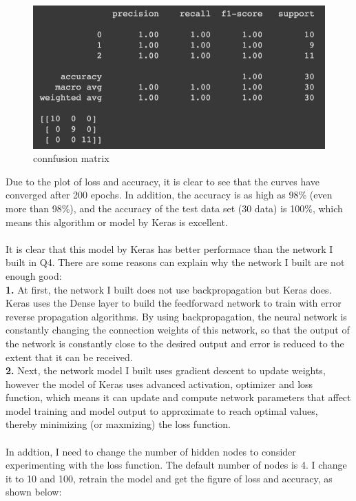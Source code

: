 \documentclass{article}
\begin{document}
\begin{figure}[H]
\centering
\includegraphics[scale=0.3]{matrix.png}
\caption{connfusion matrix}
\end{figure}
\noindent
Due to the plot of loss and accuracy, it is clear to see that the curves have converged after 200 epochs. In addition, the accuracy is as high as 98\% (even more than 98\%), and the accuracy of the test data set (30 data) is 100\%, which means this algorithm or model by Keras is excellent.\\\\
It is clear that this model by Keras has better performace than the network I built in Q4. There are some reasons can explain why the network I built are not enough good:\\
\textbf{1.} At first, the network I built does not use backpropagation but Keras does. Keras uses the Dense layer to build the feedforward network to train with error reverse propagation algorithms. By using backpropagation, the neural network is constantly changing the connection weights of this network, so that the output of the network is constantly close to the desired output and error is reduced to the extent that it can be received.\\
\textbf{2.} Next, the network model I built uses gradient descent to update weights, however the model of Keras uses advanced activation, optimizer and loss function, which means it can update and compute network parameters that affect model training and model output to approximate to reach optimal values, thereby minimizing (or maxmizing) the loss function.\\\\
In addtion, I need to change the number of hidden nodes to consider experimenting with the loss function. The default number of nodes is 4. I change it to 10 and 100, retrain the model and get the figure of loss and accuracy, as shown below:
\end{document}
